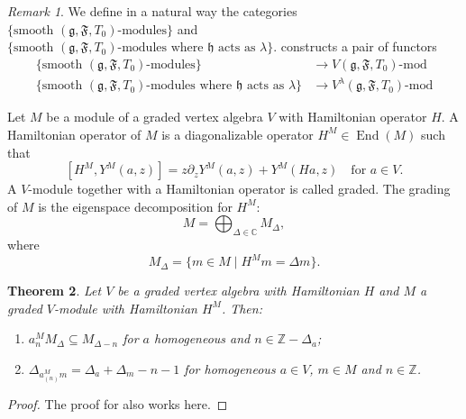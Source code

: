 \documentclass[a4paper, 12pt, reqno]{amsart}
\newtheorem{theorem}{Theorem}[subsection]
\theoremstyle{remark}
\newtheorem{remark}[theorem]{Remark}
\numberwithin{equation}{subsection}
\DeclareMathOperator{\End}{End}
\begin{document}
\begin{remark}
  \label{rmk:20}
  We define in a natural way the categories $\{\text{smooth }(\mathfrak{g}, \mathfrak{F}, T_0)\text{-modules}\}$ and $\{\text{smooth }(\mathfrak{g}, \mathfrak{F}, T_0)\text{-modules where }\mathfrak{h}\text{ acts as }\lambda\}$.
   constructs a pair of functors
  \begin{align*}
    \{\text{smooth }(\mathfrak{g}, \mathfrak{F}, T_0)\text{-modules}\} &\to V(\mathfrak{g}, \mathfrak{F}, T_0)\text{-mod} \\
    \{\text{smooth }(\mathfrak{g}, \mathfrak{F}, T_0)\text{-modules where }\mathfrak{h}\text{ acts as }\lambda\} &\to V^{\lambda}(\mathfrak{g}, \mathfrak{F}, T_0)\text{-mod}
  \end{align*}
\end{remark}

Let $M$ be a module of a graded vertex algebra $V$ with Hamiltonian operator $H$. 
A Hamiltonian operator of $M$ is a diagonalizable operator $H^M \in \End(M)$ such that
\begin{equation}
  \label{eq:27}
  [H^M, Y^M(a, z)] = z\partial_zY^M(a, z) + Y^M(Ha, z) \quad \text{for }a \in V.
\end{equation}
A $V$-module together with a Hamiltonian operator is called graded.
The grading of $M$ is the eigenspace decomposition for $H^M$:
\begin{equation*}
  M = \bigoplus_{\Delta \in \mathbb{C}}M_{\Delta},
\end{equation*}
where
\begin{equation*}
  M_{\Delta} = \{m \in M \mid H^Mm = \Delta m\}.
\end{equation*}

\begin{theorem}
  \label{thr:21}
  Let $V$ be a graded vertex algebra with Hamiltonian $H$ and $M$ a graded $V$-module with Hamiltonian $H^M$.
  Then:
  \begin{enumerate}
  \item $a^M_nM_\Delta\subseteq M_{\Delta - n}$ for $a$ homogeneous and $n \in \mathbb{Z}-\Delta_a$;
  \item $\Delta_{a^M_{(n)}m}=\Delta_a+\Delta_m-n-1$ for homogeneous $a\in V$, $m\in M$ and $n\in \mathbb{Z}$.
  \end{enumerate}
\end{theorem}

\begin{proof}
  The proof for  also works here.
\end{proof}
\end{document}

